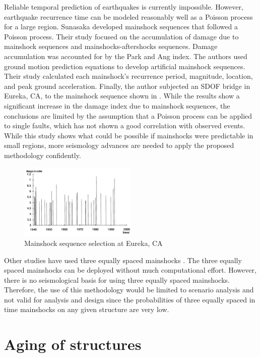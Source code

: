 Reliable temporal prediction of earthquakes is currently impossible. However, earthquake recurrence time can be modeled reasonably well as a Poisson process for a large region. Sunasaka \cite{Sunasaka1993} developed mainshock sequences that followed a Poisson process. Their study focused on the accumulation of damage due to mainshock sequences and mainshocks-aftershocks sequences. Damage accumulation was accounted for by the Park and Ang index. The authors used ground motion prediction equations to develop artificial mainshock sequences. Their study calculated each mainshock's recurrence period, magnitude, location, and peak ground acceleration. Finally, the author subjected an SDOF bridge in Eureka, CA, to the mainshock sequence shown in   . While the results show a significant increase in the damage index due to mainshock sequences, the conclusions are limited by the assumption that a Poisson process can be applied to single faults, which has not shown a good correlation with observed events\cite{Shearer2009}. While this study shows what could be possible if mainshocks were predictable in small regions, more seismology advances are needed to apply the proposed methodology confidently.

\begin{figure}[htbp]
\centering
\includegraphics[width=0.5\textwidth]{Chapter-2/figs/Mainshock_sequence_01}
\caption{Mainshock sequence selection at Eureka, CA \cite{Sunasaka1993}}
\label{fig:MS-MS_Sunasaka}
\end{figure}

Other studies have used three equally spaced mainshocks \cite{Hatzigeorgiou2009}. The three equally spaced mainshocks can be deployed without much computational effort. However, there is no seismological basis for using three equally spaced mainshocks. Therefore, the use of this methodology would be limited to scenario analysis and not valid for analysis and design since the probabilities of three equally spaced in time mainshocks on any given structure are very low.

\section{Aging of structures}

